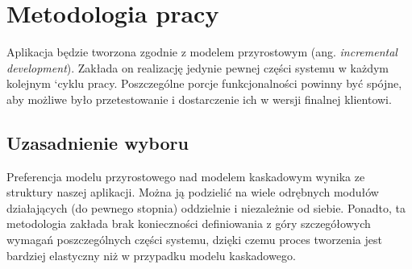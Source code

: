 \documentclass{article}
\let\oldsection\section
\renewcommand\section{\clearpage\oldsection} %
\begin{document}
\section{Metodologia pracy}

Aplikacja będzie tworzona zgodnie z modelem przyrostowym (ang. \textit{incremental development}). Zakłada on realizację jedynie pewnej części systemu w każdym kolejnym `cyklu pracy. Poszczególne porcje funkcjonalności powinny być spójne, aby możliwe było przetestowanie i dostarczenie ich w wersji finalnej klientowi.

\subsection{Uzasadnienie wyboru}

Preferencja modelu przyrostowego nad modelem kaskadowym wynika ze struktury naszej aplikacji. Można ją podzielić na wiele odrębnych modułów działających (do pewnego stopnia) oddzielnie i niezależnie od siebie. Ponadto, ta metodologia zakłada brak konieczności definiowania z góry szczegółowych wymagań poszczególnych części systemu, dzięki czemu proces tworzenia jest bardziej elastyczny niż w przypadku modelu kaskadowego.
\end{document}
